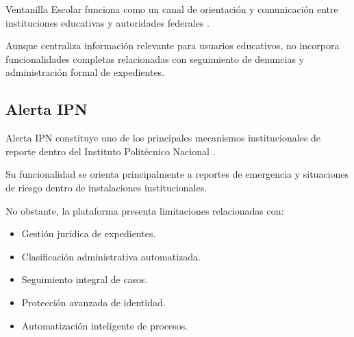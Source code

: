 \begin{flushleft}
\justifying

Ventanilla Escolar funciona como un canal de orientación y comunicación entre instituciones educativas y autoridades federales \cite{22}.

Aunque centraliza información relevante para usuarios educativos, no incorpora funcionalidades completas relacionadas con seguimiento de denuncias y administración formal de expedientes.

\end{flushleft}


\subsection{Alerta IPN}

\begin{flushleft}
\justifying

Alerta IPN constituye uno de los principales mecanismos institucionales de reporte dentro del Instituto Politécnico Nacional \cite{23}.

Su funcionalidad se orienta principalmente a reportes de emergencia y situaciones de riesgo dentro de instalaciones institucionales.

No obstante, la plataforma presenta limitaciones relacionadas con:

\begin{itemize}

    \item Gestión jurídica de expedientes.
    
    \item Clasificación administrativa automatizada.
    
    \item Seguimiento integral de casos.
    
    \item Protección avanzada de identidad.
    
    \item Automatización inteligente de procesos.

\end{itemize}

\end{flushleft}


